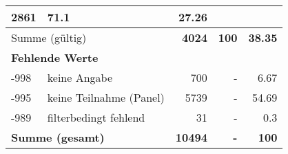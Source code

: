 \begin{longtable}{lXrrr}
       \num{2861} &
       \num[round-mode=places,round-precision=2]{71,1} &
         \num[round-mode=places,round-precision=2]{27,26} \\
     \midrule
     \multicolumn{2}{l}{Summe (gültig)} &
       \textbf{\num{4024}} &
     \textbf{100} &
       \textbf{\num[round-mode=places,round-precision=2]{38,35}} \\
     \multicolumn{5}{l}{\textbf{Fehlende Werte}}\\
       -998 &
       keine Angabe &
         \num{700} &
        - &
         \num[round-mode=places,round-precision=2]{6,67} \\
       -995 &
       keine Teilnahme (Panel) &
         \num{5739} &
        - &
         \num[round-mode=places,round-precision=2]{54,69} \\
       -989 &
       filterbedingt fehlend &
         \num{31} &
        - &
         \num[round-mode=places,round-precision=2]{0,3} \\
     \midrule
     \multicolumn{2}{l}{\textbf{Summe (gesamt)}} &
          \textbf{\num{10494}} &
        \textbf{-} &
        \textbf{100} \\
     \bottomrule
     \end{longtable}
     

